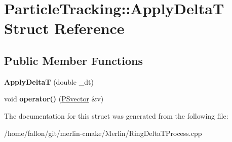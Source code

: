 \hypertarget{structParticleTracking_1_1ApplyDeltaT}{}\section{Particle\+Tracking\+:\+:Apply\+DeltaT Struct Reference}
\label{structParticleTracking_1_1ApplyDeltaT}
\subsection*{Public Member Functions}
\begin{DoxyCompactItemize}
\item 
\mbox{\label{structParticleTracking_1_1ApplyDeltaT_aa28643de7cbcebfb80ff88c178e10a57}} 
{\bfseries Apply\+DeltaT} (double \+\_\+dt)
\item 
\mbox{\label{structParticleTracking_1_1ApplyDeltaT_a955db807255e6128cbfb245921e9f26e}} 
void {\bfseries operator()} (\hyperlink{classPSvector}{P\+Svector} \&v)
\end{DoxyCompactItemize}


The documentation for this struct was generated from the following file\+:\begin{DoxyCompactItemize}
\item 
/home/fallon/git/merlin-\/cmake/\+Merlin/Ring\+Delta\+T\+Process.\+cpp\end{DoxyCompactItemize}
